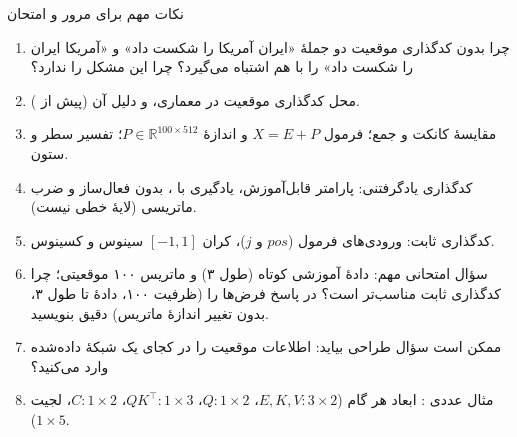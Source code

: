 \begin{exambox}{نکات مهم برای مرور و امتحان}
\begin{enumerate}
  \item چرا  بدون کدگذاری موقعیت دو جملهٔ «ایران آمریکا را شکست داد» و «آمریکا ایران را شکست داد» را با هم اشتباه می‌گیرد؟ چرا  این مشکل را ندارد؟
  \item محل کدگذاری موقعیت در معماری، و دلیل آن (پیش از ).
  \item مقایسهٔ کانکت و جمع؛ فرمول $X=E+P$ و اندازهٔ $P\in\mathbb{R}^{100\times512}$؛ تفسیر سطر و ستون.
  \item کدگذاری یادگرفتنی: پارامتر قابل‌آموزش، یادگیری با ، بدون فعال‌ساز و ضرب ماتریسی (لایهٔ خطی نیست).
  \item کدگذاری ثابت: ورودی‌های فرمول ($pos$ و $j$)، کران $[-1,1]$ سینوس و کسینوس.
  \item سؤال امتحانی مهم: دادهٔ آموزشی کوتاه (طول ۳) و ماتریس ۱۰۰ موقعیتی؛ چرا کدگذاری ثابت مناسب‌تر است؟ در پاسخ فرض‌ها را (ظرفیت ۱۰۰، دادهٔ تا طول ۳، بدون تغییر اندازهٔ ماتریس) دقیق بنویسید.
  \item ممکن است سؤال طراحی بیاید: اطلاعات موقعیت را در کجای یک شبکهٔ داده‌شده وارد می‌کنید؟
  \item مثال عددی : ابعاد هر گام ($E,K,V:3\times2$، $Q:1\times2$، $QK^\top:1\times3$، $C:1\times2$، لجیت $1\times5$).
\end{enumerate}
\end{exambox}
